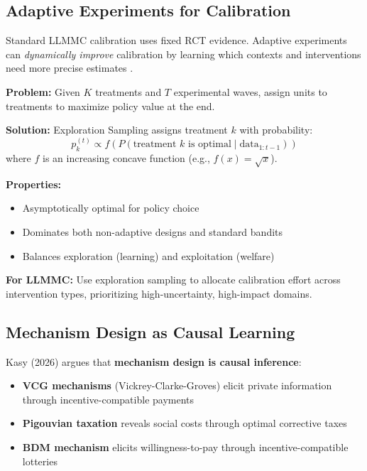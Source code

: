 \subsection{Adaptive Experiments for Calibration}

Standard LLMMC calibration uses fixed RCT evidence. Adaptive experiments can
\emph{dynamically improve} calibration by learning which contexts and interventions
need more precise estimates \citep{PAP-kasy2021adaptive}.

\begin{tcolorbox}[colback=green!5!white, colframe=green!75!black,
    title=Exploration Sampling Algorithm (Kasy \& Sautmann 2021)]

\textbf{Problem:} Given $K$ treatments and $T$ experimental waves, assign units
to treatments to maximize policy value at the end.

\textbf{Solution:} Exploration Sampling assigns treatment $k$ with probability:
\[
p_k^{(t)} \propto f\left( P(\text{treatment } k \text{ is optimal} \mid \text{data}_{1:t-1}) \right)
\]
where $f$ is an increasing concave function (e.g., $f(x) = \sqrt{x}$).

\textbf{Properties:}
\begin{itemize}[nosep]
\item Asymptotically optimal for policy choice
\item Dominates both non-adaptive designs and standard bandits
\item Balances exploration (learning) and exploitation (welfare)
\end{itemize}

\textbf{For LLMMC:} Use exploration sampling to allocate calibration effort
across intervention types, prioritizing high-uncertainty, high-impact domains.
\end{tcolorbox}

\subsection{Mechanism Design as Causal Learning}

Kasy (2026) argues that \textbf{mechanism design is causal inference}:

\begin{itemize}
\item \textbf{VCG mechanisms} (Vickrey-Clarke-Groves) elicit private information
through incentive-compatible payments \citep{PAP-vickrey1961counterspeculation,
PAP-clarke1971multipart, PAP-groves1973incentives}

\item \textbf{Pigouvian taxation} reveals social costs through optimal corrective
taxes \citep{PAP-pigou1920welfare}

\item \textbf{BDM mechanism} elicits willingness-to-pay through incentive-compatible
lotteries \citep{PAP-becker1964bdm}
\end{itemize}

